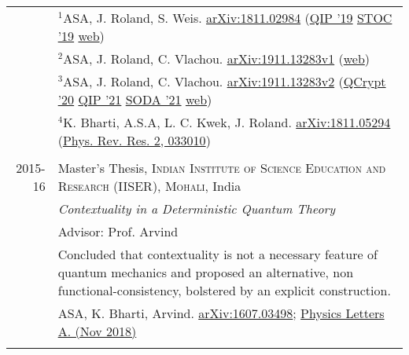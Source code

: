 \documentclass[a4paper,10pt]{article}
\begin{document}
\begin{longtable}{r|p{11cm}}
                    &\small{{\tiny $^1$}ASA, J. Roland, S. Weis. \href{https://arxiv.org/abs/1811.02984}{arXiv:1811.02984} (\href{https://www.youtube.com/watch?v=eNK6X7BlG5U&list=PLGdMsPGuoD25wLgnY7RBoTAxsnQEMsNA0&index=12}{QIP '19} \href{http://dx.doi.org/10.1145/3313276.3316306}{STOC '19} \href{https://atulsingharora.github.io/WCF}{web}) }\\
                    &\small{{\tiny $^2$}ASA, J. Roland, C. Vlachou. \href{https://arxiv.org/abs/1911.13283v1}{arXiv:1911.13283v1}} (\href{https://atulsingharora.github.io/WCF_2}{web})\\
                    &\small{{\tiny $^3$}ASA, J. Roland, C. Vlachou. \href{https://arxiv.org/abs/1911.13283v2}{arXiv:1911.13283v2} (\href{https://youtu.be/A2GRxspzWUg?t=801}{QCrypt '20} \href{https://youtu.be/nlZ5JhoE0D8}{QIP '21} \href{https://doi.org/10.1137/1.9781611976465.58}{SODA '21} \href{https://atulsingharora.github.io/WCF_2}{web}})\\
                    &\small{{\tiny $^4$}K. Bharti, A.S.A, L. C. Kwek, J. Roland. \href{https://arxiv.org/abs/1811.05294}{arXiv:1811.05294} (\href{https://link.aps.org/doi/10.1103/PhysRevResearch.2.033010}{Phys. Rev. Res. 2, 033010}) }\\
  \\

 \textsc{2015-16} & Master's Thesis, \textsc{Indian Institute of Science Education and Research (IISER), Mohali}, India \\
                  &\emph{Contextuality in a Deterministic Quantum Theory}\\
                  &\small Advisor: Prof. Arvind\\ 
                  &\footnotesize{Concluded that contextuality is not a necessary feature of quantum mechanics and proposed an alternative, non functional-consistency, bolstered by an explicit construction.}\\
                  &\small{ASA, K. Bharti, Arvind. \href{https://arxiv.org/abs/1607.03498}{arXiv:1607.03498}; \href{https://doi.org/10.1016/j.physleta.2018.11.049}{Physics Letters A. (Nov 2018)} }\\            
 \\


\end{longtable}
\end{document}
